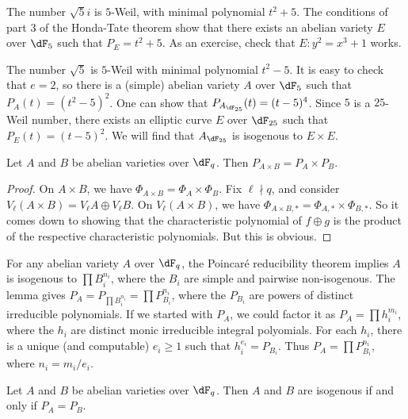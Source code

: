 \begin{example}
The number $\sqrt 5 i$ is $5$-Weil, with minimal polynomial $t^2+5$. The 
conditions of part 3 of the Honda-Tate theorem show that there exists an 
abelian variety $E$ over $\dF_5$ such that $P_E=t^2+5$. As an exercise, check 
that $E:y^2=x^3+1$ works. 
\end{example}

\begin{example}
The number $\sqrt 5$ is $5$-Weil with minimal polynomial $t^2-5$. It is easy to 
check that $e=2$, so there is a (simple) abelian variety $A$ over $\dF_5$ such 
that $P_A(t) = (t^2-5)^2$. One can show that $P_{A_{\dF_{25}}}(t) = (t-5)^4$. 
Since $5$ is a $25$-Weil number, there exists an elliptic curve $E$ over 
$\dF_{25}$ such that $P_E(t)=(t-5)^2$. We will find that $A_{\dF_{25}}$ is 
isogenous to $E\times E$. 
\end{example}






\begin{lemma}
Let $A$ and $B$ be abelian varieties over $\dF_q$. Then 
$P_{A\times B}=P_A\times P_B$. 
\end{lemma}
\begin{proof}
On $A\times B$, we have $\Phi_{A\times B}=\Phi_A\times \Phi_B$. Fix 
$\ell\nmid q$, and consider $V_\ell(A\times B)=V_\ell A\oplus V_\ell B$. On 
$V_\ell(A\times B)$, we have 
$\Phi_{A\times B,\ast} = \Phi_{A,\ast}\times \Phi_{B,\ast}$. So it comes down 
to showing that the characteristic polynomial of $f\oplus g$ is the product of 
the respective characteristic polynomials. But this is obvious. 
\end{proof}

For any abelian variety $A$ over $\dF_q$, the Poincar\'e reducibility theorem 
implies $A$ is isogenous to $\prod B_i^{n_i}$, where the $B_i$ are simple and 
pairwise non-isogenous. The lemma gives 
$P_A=P_{\prod B_i^{n_i}} = \prod P_{B_i}^{n_i}$, where the $P_{B_i}$ are powers 
of distinct irreducible polynomials. If we started with $P_A$, we could factor 
it as $P_A=\prod h_i^{m_i}$, where the $h_i$ are distinct monic irreducible 
integral polyomials. For each $h_i$, there is a unique (and computable) 
$e_i\geqslant 1$ such that $h_i^{e_i} = P_{B_i}$. Thus 
$P_A=\prod P_{B_i}^{n_i}$, where $n_i=m_i/e_i$. 

\begin{theorem}
Let $A$ and $B$ be abelian varieties over $\dF_q$. Then $A$ and $B$ are 
isogenous if and only if $P_A=P_B$.
\end{theorem}

